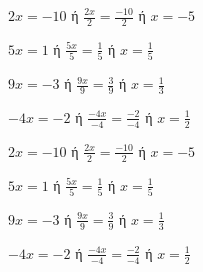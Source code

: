 \begin{alist}
\item $ 2x=-10 $ ή $ \frac{2x}{2}=\frac{-10}{2} $ ή $ x=-5 $
\item $ 5x=1 $ ή $ \frac{5x}{5}=\frac{1}{5} $ ή $ x=\frac{1}{5} $
\item $ 9x=-3 $ ή $ \frac{9x}{9}=\frac{3}{9} $ ή $ x=\frac{1}{3} $
\item $ -4x=-2 $ ή $ \frac{-4x}{-4}=\frac{-2}{-4} $ ή $ x=\frac{1}{2} $
\end{alist}
\begin{alist}
\item $ 2x=-10 $ ή $ \frac{2x}{2}=\frac{-10}{2} $ ή $ x=-5 $
\item $ 5x=1 $ ή $ \frac{5x}{5}=\frac{1}{5} $ ή $ x=\frac{1}{5} $
\item $ 9x=-3 $ ή $ \frac{9x}{9}=\frac{3}{9} $ ή $ x=\frac{1}{3} $
\item $ -4x=-2 $ ή $ \frac{-4x}{-4}=\frac{-2}{-4} $ ή $ x=\frac{1}{2} $
\end{alist}
